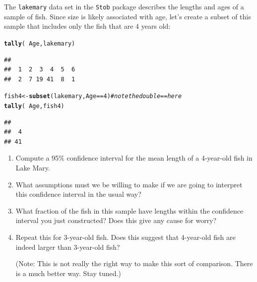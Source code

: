 \documentclass[twoside]{book}\usepackage[]{graphicx}\usepackage[]{xcolor}
\makeatletter
\newcommand{\hlnum}[1]{\textcolor[rgb]{0.686,0.059,0.569}{#1}}%
\newcommand{\hlcom}[1]{\textcolor[rgb]{0.678,0.584,0.686}{\textit{#1}}}%
\newcommand{\hlopt}[1]{\textcolor[rgb]{0,0,0}{#1}}%
\newcommand{\hlstd}[1]{\textcolor[rgb]{0.345,0.345,0.345}{#1}}%
\newcommand{\hlkwb}[1]{\textcolor[rgb]{0.69,0.353,0.396}{#1}}%
\newcommand{\hlkwd}[1]{\textcolor[rgb]{0.737,0.353,0.396}{\textbf{#1}}}%
\newenvironment{kframe}{%
 \def\at@end@of@kframe{}%
 \ifinner\ifhmode%
  \def\at@end@of@kframe{\end{minipage}}%
  \begin{minipage}{\columnwidth}%
 \fi\fi%
 \def\FrameCommand##1{\hskip\@totalleftmargin \hskip-\fboxsep
 \colorbox{shadecolor}{##1}\hskip-\fboxsep
     \hskip-\linewidth \hskip-\@totalleftmargin \hskip\columnwidth}%
 \MakeFramed {\advance\hsize-\width
   \@totalleftmargin\z@ \linewidth\hsize
   \@setminipage}}%
 {\par\unskip\endMakeFramed%
 \at@end@of@kframe}
\newenvironment{knitrout}{}{} %
\newcommand{\Rindex}[1]{\index{\texttt{#1}}}
\newcommand{\dataframe}[1]{{\color{blue!80!black}\texttt{#1}}\Rindex{#1}}
\newcommand{\pkg}[1]{{\color{red!80!black}\texttt{#1}}\Rindex{#1}}
\makeatother
\begin{document}
\begin{problem}
	The \dataframe{lakemary} data set in the \pkg{Stob} package describes the 
	lengths and ages of a sample of fish.  Since size is likely associated with
	age, let's create a subset of this sample that includes only the fish 
	that are 4 years old:
\begin{knitrout}
\color{fgcolor}\begin{kframe}
\begin{alltt}
\hlkwd{tally}\hlstd{(}\hlopt{~}\hlstd{Age, lakemary)}
\end{alltt}
\begin{verbatim}
## 
##  1  2  3  4  5  6 
##  2  7 19 41  8  1
\end{verbatim}
\begin{alltt}
\hlstd{fish4} \hlkwb{<-} \hlkwd{subset}\hlstd{(lakemary, Age} \hlopt{==} \hlnum{4}\hlstd{)}  \hlcom{# note the double == here}
\hlkwd{tally}\hlstd{(}\hlopt{~}\hlstd{Age, fish4)}
\end{alltt}
\begin{verbatim}
## 
##  4 
## 41
\end{verbatim}
\end{kframe}
\end{knitrout}
	\begin{enumerate}
		\item
			Compute a 95\% confidence interval for the mean length 
			of a 4-year-old fish in Lake Mary.
		\item
			What assumptions must we be willing to make if we are 
			going to interpret this confidence interval in the usual way?
		\item
			What fraction of the fish in this sample have lengths within
			the confidence interval you just constructed?  Does this give 
			any cause for worry?
		\item
			Repeat this for 3-year-old fish.  Does this suggest that 
			4-year-old fish are indeed larger than 3-year-old fish?  
			
			(Note: This is not really the right way to make this sort of comparison.
			There is a much better way. Stay tuned.)
	\end{enumerate}
\end{problem}
\end{document}

